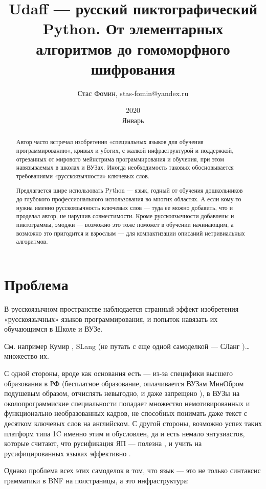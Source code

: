 ﻿\documentclass[a4paper,12pt]{article}
\title{Udaff — русский пиктографический Python. От элементарных алгоритмов до гомоморфного шифрования}
\date{2020 \\ Январь}
\author{Стас Фомин, stas-fomin@yandex.ru}
\begin{document}
\maketitle
\begin{abstract}
    Автор часто встречал изобретения «специальных языков для обучения программированию», кривых и убогих, с жалкой инфраструктурой и поддержкой, отрезанных от мирового мейнстрима программирования и обучения, при этом навязываемых в школах и ВУЗах. Иногда необходимость таковых обосновывается требованиями «русскоязычности» ключевых слов. 

    Предлагается шире использовать Python — язык, годный от обучения дошкольников до глубокого профессионального использования во многих областях. А если кому-то нужна именно русскоязычность ключевых слов — туда ее можно добавить, что и проделал автор, не нарушив совместимости. Кроме русскоязычности добавлены и пиктограммы, эмоджи — возможно это тоже поможет в обучении начинающим, а возможно это пригодится и взрослым — для компактизации описаний нетривиальных алгоритмов.
\end{abstract}

\section{Проблема}

В русскоязычном пространстве наблюдается странный эффект изобретения
«русскоязычных» языков программирования, и попыток навязать их
обучающимся в Школе и ВУЗе.  

См. например Кумир \cite{kumir}, SLang \cite{slang}
(не путать с еще одной самоделкой --- СЛанг \cite{slang2})\ldots{} множество их.
  
С одной стороны, вроде как основания есть --- из-за специфики высшего
образования в РФ (бесплатное образование, оплачивается ВУЗам МинОбром
подушевым образом, отчислять невыгодно, и даже запрещено \cite{fire-restricted}), 
в ВУЗы на околопрограммиские специальности попадает множество немотивированных и
функционально необразованных кадров, не способных понимать даже текст с
десятком ключевых слов на английском. С другой стороны, возможно успех
таких платформ типа 1C именно этим и обусловлен, да и есть немало
энтузиастов, которые
считают, что русификация ЯП --- полезна \cite{russification-good}, и
учить на русифицированных
языках эффективно \cite{russification-effective}.

Однако проблема всех этих самоделок в том, что язык --- это не только
синтаксис грамматики в BNF на полстраницы, а это инфраструктура:
\end{document}
